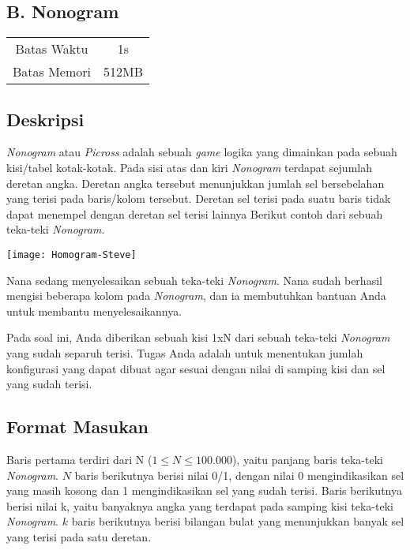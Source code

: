 \documentclass{article}
\begin{document}
\begin{center}
    \section*{B. Nonogram} %

    \begin{tabular}{ | c c | }
        \hline
        Batas Waktu  & 1s \\    %
        Batas Memori & 512MB \\  %
        \hline
    \end{tabular}
\end{center}

\subsection*{Deskripsi}

\textit{Nonogram} atau \textit{Picross} adalah sebuah \textit{game} logika yang dimainkan pada sebuah kisi/tabel kotak-kotak.
Pada sisi atas dan kiri \textit{Nonogram} terdapat sejumlah deretan angka.
Deretan angka tersebut menunjukkan jumlah sel bersebelahan yang terisi pada baris/kolom tersebut.
Deretan sel terisi pada suatu baris tidak dapat menempel dengan deretan sel terisi lainnya
Berikut contoh dari sebuah teka-teki \textit{Nonogram}.

\texttt{[image: Homogram-Steve]}

Nana sedang menyelesaikan sebuah teka-teki \textit{Nonogram}. 
Nana sudah berhasil mengisi beberapa kolom pada \textit{Nonogram}, dan ia membutuhkan bantuan Anda untuk membantu menyelesaikannya.

Pada soal ini, Anda diberikan sebuah kisi 1xN dari sebuah teka-teki \textit{Nonogram} yang sudah separuh terisi.
Tugas Anda adalah untuk menentukan jumlah konfigurasi yang dapat dibuat agar sesuai dengan nilai di samping kisi dan sel yang sudah terisi.

\subsection*{Format Masukan}

Baris pertama terdiri dari N ($1 \leq N \leq 100.000$), yaitu panjang baris teka-teki \textit{Nonogram}.
$N$ baris berikutnya berisi nilai 0/1, dengan nilai 0 mengindikasikan sel yang masih kosong dan 1 mengindikasikan sel yang sudah terisi.
Baris berikutnya berisi nilai k, yaitu banyaknya angka yang terdapat pada samping kisi teka-teki \textit{Nonogram}.
$k$ baris berikutnya berisi bilangan bulat yang menunjukkan banyak sel yang terisi pada satu deretan.
\end{document}
